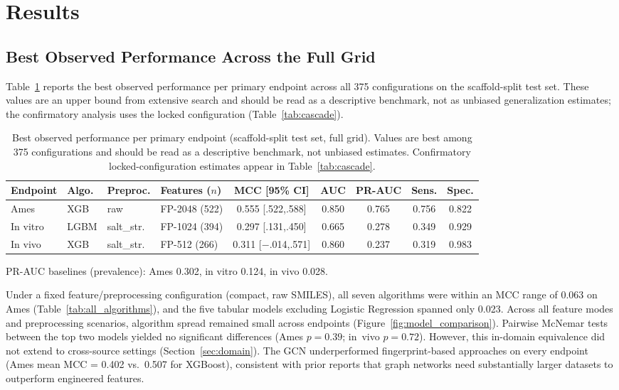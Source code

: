 \section{Results}

\subsection{Best Observed Performance Across the Full Grid}

Table~\ref{tab:best_models} reports the best observed performance per primary endpoint across all 375 configurations on the scaffold-split test set. These values are an upper bound from extensive search and should be read as a descriptive benchmark, not as unbiased generalization estimates; the confirmatory analysis uses the locked configuration (Table~\ref{tab:cascade}).

\begin{table}[ht]
\caption{Best observed performance per primary endpoint (scaffold-split test set, full grid). Values are best among 375 configurations and should be read as a descriptive benchmark, not unbiased estimates. Confirmatory locked-configuration estimates appear in Table~\ref{tab:cascade}.}
\label{tab:best_models}
\centering
\small
\begin{tabular}{@{}llllccccc@{}}
\toprule
Endpoint & Algo. & Preproc. & Features ($n$) & MCC [95\% CI] & AUC & PR-AUC & Sens. & Spec. \\
\midrule
Ames & XGB & raw & FP-2048 (522) & 0.555 [.522,.588] & 0.850 & 0.765 & 0.756 & 0.822 \\
In vitro & LGBM & salt\_str. & FP-1024 (394) & 0.297 [.131,.450] & 0.665 & 0.278 & 0.349 & 0.929 \\
In vivo & XGB & salt\_str. & FP-512 (266) & 0.311 [$-$.014,.571] & 0.860 & 0.237 & 0.319 & 0.983 \\
\bottomrule
\end{tabular}

\medskip
\footnotesize
PR-AUC baselines (prevalence): Ames 0.302, in vitro 0.124, in vivo 0.028.
\end{table}

Under a fixed feature/preprocessing configuration (compact, raw SMILES), all seven algorithms were within an MCC range of 0.063 on Ames (Table~\ref{tab:all_algorithms}), and the five tabular models excluding Logistic Regression spanned only 0.023. Across all feature modes and preprocessing scenarios, algorithm spread remained small across endpoints (Figure~\ref{fig:model_comparison}). Pairwise McNemar tests\cite{McNemar_1947} between the top two models yielded no significant differences (Ames $p = 0.39$; in~vivo $p = 0.72$). However, this in-domain equivalence did not extend to cross-source settings (Section~\ref{sec:domain}). The GCN underperformed fingerprint-based approaches on every endpoint (Ames mean MCC = 0.402 vs.\ 0.507 for XGBoost), consistent with prior reports that graph networks need substantially larger datasets to outperform engineered features.

